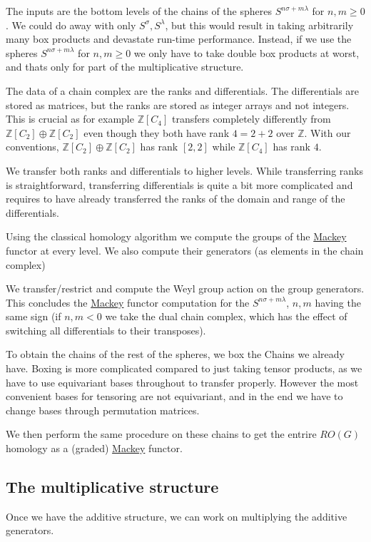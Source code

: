 \begin{DoxyItemize}
\item The inputs are the bottom levels of the chains of the spheres $S^{n\sigma+m\lambda}$ for $n,m\ge 0$. We could do away with only $S^{\sigma},S^{\lambda}$, but this would result in taking arbitrarily many box products and devastate run-\/time performance. Instead, if we use the spheres $S^{n\sigma+m\lambda}$ for $n,m\ge 0$ we only have to take double box products at worst, and that\textquotesingle{}s only for part of the multiplicative structure.
\item The data of a chain complex are the ranks and differentials. The differentials are stored as matrices, but the ranks are stored as integer arrays and not integers. This is crucial as for example $\mathbb Z[C_4]$ transfers completely differently from $\mathbb Z[C_2]\oplus \mathbb Z[C_2]$ even though they both have rank $4=2+2$ over $\mathbb Z$. With our conventions, $\mathbb Z[C_2]\oplus \mathbb Z[C_2]$ has rank $[2,2]$ while $\mathbb Z[C_4]$ has rank $4$.
\item We transfer both ranks and differentials to higher levels. While transferring ranks is straightforward, transferring differentials is quite a bit more complicated and requires to have already transferred the ranks of the domain and range of the differentials.
\item Using the classical homology algorithm we compute the groups of the \hyperlink{namespaceMackey}{Mackey} functor at every level. We also compute their generators (as elements in the chain complex)
\item We transfer/restrict and compute the Weyl group action on the group generators. This concludes the \hyperlink{namespaceMackey}{Mackey} functor computation for the $S^{n\sigma+m\lambda}$, $n,m$ having the same sign (if $n,m<0$ we take the dual chain complex, which has the effect of switching all differentials to their transposes).
\item To obtain the chains of the rest of the spheres, we box the Chains we already have. Boxing is more complicated compared to just taking tensor products, as we have to use equivariant bases throughout to transfer properly. However the most convenient bases for tensoring are not equivariant, and in the end we have to change bases through permutation matrices.
\item We then perform the same procedure on these chains to get the entrire $RO(G)$ homology as a (graded) \hyperlink{namespaceMackey}{Mackey} functor.
\end{DoxyItemize}\hypertarget{math_mult}{}\subsection{The multiplicative structure}\label{math_mult}
Once we have the additive structure, we can work on multiplying the additive generators.


